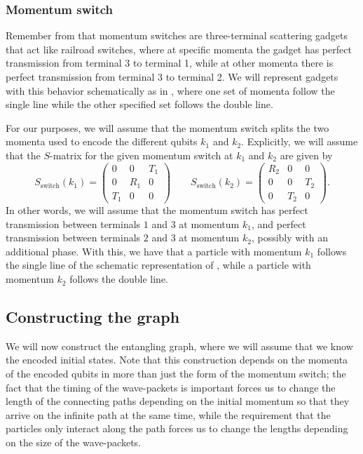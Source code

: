 \documentclass[../thesis-main/thesis-main]{subfiles}
\begin{document}
\subsubsection{Momentum switch}

Remember from  that momentum switches are three-terminal scattering gadgets that act like railroad switches, where at specific momenta the gadget has perfect transmission from terminal 3 to terminal 1, while at other momenta there is perfect transmission from terminal 3 to terminal 2.  We will represent gadgets with this behavior schematically as in , where one set of momenta follow the single line while the other specified set follows the double line.

For our purposes, we will assume that the momentum switch splits the two momenta used to encode the different qubits $k_{1}$ and $k_{2}$.  Explicitly, we will assume that the $S$-matrix for the given momentum switch at $k_1$ and $k_2$ are given by
\begin{equation}
  S_{\text{switch}}(k_{1}) = \begin{pmatrix} 0 & 0 & T_{1}\\
    0 & R_{1} & 0\\
    T_{1} & 0 & 0\end{pmatrix}\qquad
  S_{\text{switch}}(k_{2}) = \begin{pmatrix}R_{2} & 0 &0\\
    0 & 0 & T_{2}\\
    0 & T_{2} & 0\end{pmatrix}.
\label{eq:switch_S}
\end{equation}
In other words, we will assume that the momentum switch has perfect transmission between terminals $1$ and $3$ at momentum $k_{1}$, and perfect transmission between terminals $2$ and $3$ at momentum $k_{2}$, possibly with an additional phase.  With this, we have that a particle with momentum $k_{1}$ follows the single line of the schematic representation of , while a particle with momentum $k_{2}$ follows the double line.


\subsection{Constructing the graph}

We will now construct the entangling graph, where we will assume that we know the encoded initial states.  Note that this construction depends on the momenta of the encoded qubits in more than just the form of the momentum switch; the fact that the timing of the wave-packets is important forces us to change the length of the connecting paths depending on the initial momentum so that they arrive on the infinite path at the same time, while the requirement that the particles only interact along the path forces us to change the lengths depending on the size of the wave-packets.
\end{document}
